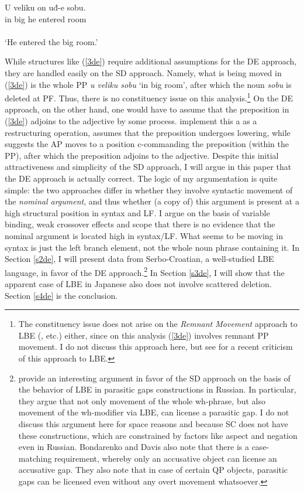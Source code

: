 \documentclass[
    output=paper,
    colorlinks,
    citecolor=brown,
]{langscibook}
\begin{document}
\begin{exe}
\ex \label{3de}
\gll U veliku on uđ-e   sobu. \hspace{38mm} \citep[78]{Boskovic2005}\\
in big he entered room\\\\
‘He entered the big room.’
\end{exe}

While structures like (\ref{3de}) require additional assumptions for the DE approach, they are handled easily on the SD approach. Namely, what is being moved in (\ref{3de}) is the whole PP \textit{u veliku sobu} ‘in big room’, after which the noun \textit{sobu} is deleted at PF. Thus, there is no constituency issue on this analysis.\footnote{The constituency issue does not arise on the \textit{Remnant Movement} approach to LBE (\citealt{FranksProgovac1994}, \citealt{bavsic2005nominal} etc.) either, since on this analysis (\ref{3de}) involves remnant PP movement. I do not discuss this approach here, but see \citet{murphy2020left} for a recent criticism of this approach to LBE. } On the DE approach, on the other hand, one would have to assume that the preposition in (\ref{3de}) adjoins to the adjective by some process. \citet{BorsleyJaworska1988} implement this a as a restructuring operation, \citet{Corver1992} assumes that the preposition undergoes lowering, while \citet{Boskovic2005} suggests the AP moves to a position c-commanding the preposition (within the PP), after which the preposition adjoins to the adjective. 
Despite this initial attractiveness and simplicity of the SD approach, I will argue in this paper that the DE approach is actually correct. The logic of my argumentation is quite simple: the two approaches differ in whether they involve syntactic movement of the \textit{nominal argument}, and thus whether (a copy of) this argument is present at a high structural position in syntax and LF. I argue on the basis of variable binding, weak crossover effects and scope that there is no evidence that the nominal argument is located high in syntax/LF. What seems to be moving in syntax is just the left branch element, not the whole noun phrase containing it. In Section \ref{s2de}, I will present data from Serbo-Croatian, a well-studied LBE language, in favor of the DE approach.\footnote{\citet{BondarenkoColin2018} provide an interesting argument in favor of the SD approach on the basis of the behavior of LBE in parasitic gaps constructions in Russian. In particular, they argue that not only movement of the whole wh-phrase, but also movement of the wh-modifier via LBE, can license a parasitic gap. I do not discuss this argument here for space reasons and because SC does not have these constructions, which are constrained by factors like aspect and negation even in Russian. Bondarenko and Davis also note that there is a case-matching requirement, whereby only an accusative object can license an accusative gap. They also note that in case of certain QP objects, parasitic gaps can be licensed even without any overt movement whatsoever.} In Section \ref{s3de}, I will show that the apparent case of LBE in Japanese \citep{TakahashiFunakoshi2013} also does not involve scattered deletion. Section \ref{s4de} is the conclusion. 
\end{document}
